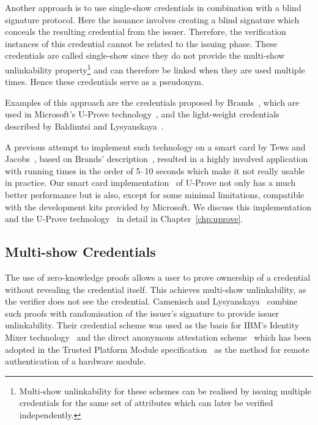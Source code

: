 Another approach is to use single-show credentials in combination with a blind signature protocol. Here the issuance involves creating a blind signature which
conceals the resulting credential from the issuer. Therefore, the verification
instances of this credential cannot be related to the issuing phase. These
credentials are called single-show since they do not provide the multi-show
unlinkability property\footnote{Multi-show unlinkability for these schemes can
be realised by issuing multiple credentials for the same set of attributes which
can later be verified independently.} and can therefore be linked when they are
used multiple times. Hence these credentials serve as a pseudonym.

Examples of this approach are the credentials proposed by
Brands~\cite{Brands2000}, which are used in Microsoft's U-Prove
technology~\cite{U-Prove_Crypto2013}, and the light-weight credentials described
by Baldimtsi and Lysyanskaya~\cite{BaLy2012}.

A previous attempt to implement such technology on a smart card by Tews and
Jacobs~\cite{TewsJacobs09}, based on Brands' description~\cite{Brands2000},
resulted in a highly involved application with running times in the order of
5--10 seconds which make it not really usable in practice. Our smart card
implementation~\cite{MostowskiVullers11} of U-Prove not only has a much better
performance but is also, except for some minimal limitations, compatible with
the development kits provided by Microsoft. We discuss this implementation and
the U-Prove technology~\cite{U-Prove_Crypto2013} in detail in
Chapter~\ref{chp:uprove}.

\subsection{Multi-show Credentials}

The use of zero-knowledge proofs allows a user to
prove ownership of a credential without revealing the credential itself. This
achieves multi-show unlinkability, as the verifier does not see the credential.
Camenisch and Lysyanskaya~\cite{CamenischLysyanskaya2001,CamenischLysyanskaya2003}
combine such proofs with randomisation of the issuer's signature to provide issuer unlinkability.
Their credential scheme was used as the basis for IBM's Identity Mixer
 technology~\cite{IdemixCrypto2012} and the direct
anonymous attestation
scheme~\cite{BrickellCC04} which has been adopted in the Trusted Platform Module
specification~\cite{TPM_1.2} as the method for remote authentication
 of a hardware module.

